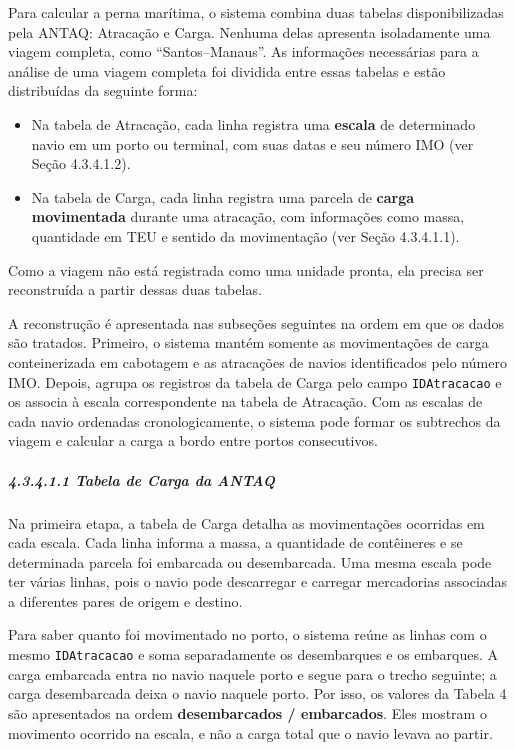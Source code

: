 \documentclass[brazil,]{article}
\let\oldsubparagraph\subparagraph
\renewcommand{\subparagraph}[1]{\Needspace{6\baselineskip}\oldsubparagraph{#1}\mbox{}}
\begin{document}
Para calcular a perna marítima, o sistema combina duas tabelas
disponibilizadas pela ANTAQ: Atracação e Carga. Nenhuma delas apresenta
isoladamente uma viagem completa, como ``Santos--Manaus''. As informações
necessárias para a análise de uma viagem completa foi dividida entre
essas tabelas e estão distribuídas da seguinte forma:

\begin{itemize}
\item
  Na tabela de Atracação, cada linha registra uma \textbf{escala} de determinado
  navio em um porto ou terminal, com suas datas e seu número IMO (ver
  Seção 4.3.4.1.2).
\item
  Na tabela de Carga, cada linha registra uma parcela de
  \textbf{carga movimentada} durante uma atracação, com informações como massa,
  quantidade em TEU e sentido da movimentação (ver Seção 4.3.4.1.1).
\end{itemize}

Como a viagem não está registrada como uma unidade pronta, ela precisa
ser reconstruída a partir dessas duas tabelas.

A reconstrução é apresentada nas subseções seguintes na ordem em que os
dados são tratados. Primeiro, o sistema mantém somente as movimentações
de carga conteinerizada em cabotagem e as atracações de navios
identificados pelo número IMO. Depois, agrupa os registros da tabela de
Carga pelo campo \texttt{IDAtracacao} e os associa à escala correspondente
na tabela de Atracação. Com as escalas de cada navio ordenadas
cronologicamente, o sistema pode formar os subtrechos da viagem e calcular
a carga a bordo entre portos consecutivos.

\hypertarget{tabela-de-carga-da-antaq}{%
\subparagraph{4.3.4.1.1 Tabela de Carga da
ANTAQ}\label{tabela-de-carga-da-antaq}}

Na primeira etapa, a tabela de Carga detalha as movimentações ocorridas
em cada escala. Cada linha informa a massa, a quantidade de contêineres e
se determinada parcela foi embarcada ou desembarcada. Uma mesma escala
pode ter várias linhas, pois o navio pode descarregar e carregar
mercadorias associadas a diferentes pares de origem e destino.

Para saber quanto foi movimentado no porto, o sistema reúne as linhas
com o mesmo \texttt{IDAtracacao} e soma separadamente os desembarques e
os embarques. A carga embarcada entra no navio naquele porto e segue
para o trecho seguinte; a carga desembarcada deixa o navio naquele
porto. Por isso, os valores da Tabela 4 são apresentados na ordem
\textbf{desembarcados / embarcados}. Eles mostram o movimento ocorrido
na escala, e não a carga total que o navio levava ao partir.
\end{document}
